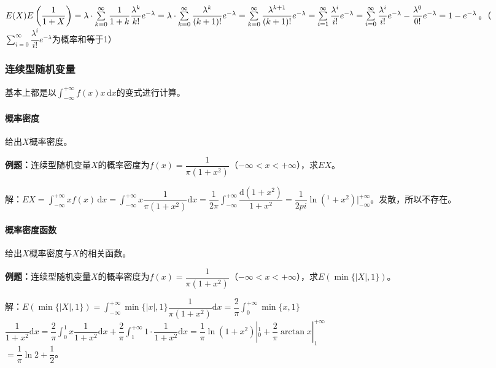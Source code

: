 \documentclass[UTF8, 12pt]{ctexart}
\begin{document}
$E(X)E\left(\dfrac{1}{1+X}\right)=\lambda\cdot\sum\limits_{k=0}^\infty\dfrac{1}{1+k}\dfrac{\lambda^k}{k!}e^{-\lambda}=\lambda\cdot\sum\limits_{k=0}^\infty\dfrac{\lambda^k}{(k+1)!}e^{-\lambda}=\sum\limits_{k=0}^\infty\dfrac{\lambda^{k+1}}{(k+1)!}e^{-\lambda}\\=\sum\limits_{i=1}^\infty\dfrac{\lambda^i}{i!}e^{-\lambda}=\sum\limits_{i=0}^\infty\dfrac{\lambda^i}{i!}e^{-\lambda}-\dfrac{\lambda^0}{0!}e^{-\lambda}=1-e^{-\lambda}$。（$\sum\limits_{i=0}^\infty\dfrac{\lambda^i}{i!}e^{-\lambda}$为概率和等于1）

\subsubsection{连续型随机变量}

基本上都是以$\int_{-\infty}^{+\infty}f(x)x\,\textrm{d}x$的变式进行计算。

\paragraph{概率密度} \leavevmode \medskip

给出$X$概率密度。

\textbf{例题：}连续型随机变量$X$的概率密度为$f(x)=\dfrac{1}{\pi(1+x^2)}$（$-\infty<x<+\infty$），求$EX$。

解：$EX=\int_{-\infty}^{+\infty}xf(x)\,\textrm{d}x=\int_{-\infty}^{+\infty}x\dfrac{1}{\pi(1+x^2)}\textrm{d}x=\dfrac{1}{2\pi}\int_{-\infty}^{+\infty}\dfrac{\textrm{d}(1+x^2)}{1+x^2}=\dfrac{1}{2pi}\ln(^1+x^2)|_{-\infty}^{+\infty}$。发散，所以不存在。

\paragraph{概率密度函数} \leavevmode \medskip

给出$X$概率密度与$X$的相关函数。

\textbf{例题：}连续型随机变量$X$的概率密度为$f(x)=\dfrac{1}{\pi(1+x^2)}$（$-\infty<x<+\infty$），求$E(\min\{\vert X\vert,1\})$。

解：$E(\min\{\vert X\vert,1\})=\displaystyle{\int_{-\infty}^{+\infty}}\min\{\vert x\vert,1\}\dfrac{1}{\pi(1+x^2)}\textrm{d}x=\dfrac{2}{\pi}\int_0^{+\infty}\min\{x,1\}$\\$\dfrac{1}{1+x^2}\textrm{d}x=\dfrac{2}{\pi}\displaystyle{\int_0^1}x\dfrac{1}{1+x^2}\textrm{d}x+\dfrac{2}{\pi}\int_1^{+\infty}1\cdot\dfrac{1}{1+x^2}\textrm{d}x=\dfrac{1}{\pi}\ln(1+x^2)|_0^1+\dfrac{2}{\pi}\arctan x|_1^{+\infty}$\\$=\dfrac{1}{\pi}\ln2+\dfrac{1}{2}$。
\end{document}
